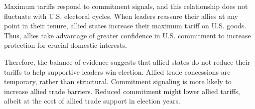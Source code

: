 \documentclass[12pt]{article}
\begin{document}
Maximum tariffs respond to commitment signals, and this relationship does not fluctuate with U.S. electoral cycles.
When leaders reassure their allies at any point in their tenure, allied states increase their maximum tariff on U.S. goods.
Thus, allies take advantage of greater confidence in U.S. commitment to increase protection for crucial domestic interests.


Therefore, the balance of evidence suggests that allied states do not reduce their tariffs to help supportive leaders win election.
Allied trade concessions are temporary, rather than structural.
Commitment signaling is more likely to increase allied trade barriers.
Reduced commitment might lower allied tariffs, albeit at the cost of allied trade support in election years.


\newpage
\singlespace
 
 
\end{document}

